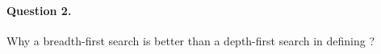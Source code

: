\paragraph{Question 2.} Why a breadth-first search is better than a
depth-first search in defining ?

